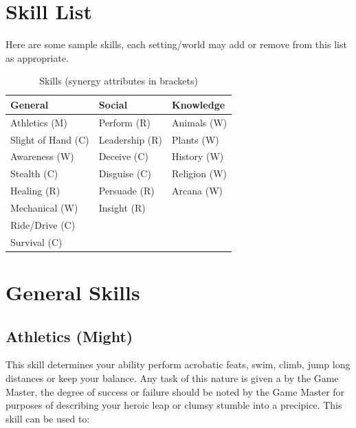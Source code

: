 \documentclass[a4paper,10pt,oneside]{book}
\newcommand{\textlf}[1]{\textbf{\titlecap{#1}}}
\begin{document}
\section{Skill List}
Here are some sample skills, each setting/world may add or remove from this list as appropriate.

\begin{table}[ht!]
	\centering
	\caption{Skills (synergy attributes in brackets)}
	\begin{tabular}{|l|l|l|}
		\hline
		 General & Social & Knowledge\\ [0.5ex]
		\hline
		Athletics (M) & Perform (R) & Animals (W)\\
		Slight of Hand (C) & Leadership (R) & Plants (W)\\
		Awareness (W) & Deceive (C) & History (W)\\
		Stealth (C) & Disguise (C) & Religion (W) \\
		Healing (R)  & Persuade (R) & Arcana (W)\\
		Mechanical (W)  & Insight (R) & \\
		Ride/Drive (C) & & \\
		Survival (C) & & \\
		\hline
	\end{tabular}
\end{table}



\section{General Skills}

\subsection{Athletics (Might)}
This skill determines your ability perform acrobatic feats, swim, climb, jump long distances or keep your balance. Any task of this nature is given a \textlf{difficulty} by the Game Master, the degree of success or failure should be noted by the Game Master for purposes of describing your heroic leap or clumsy stumble into a precipice.  This skill can be used to:
\end{document}
